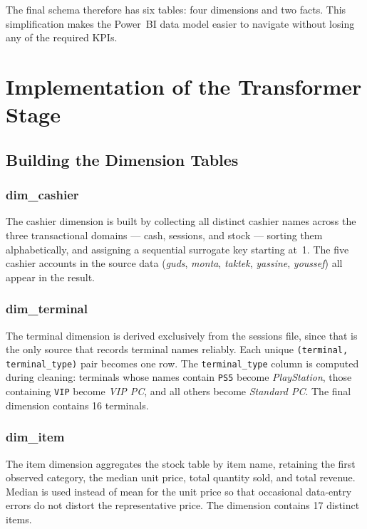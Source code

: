The final schema therefore has six tables: four dimensions and two facts. This
simplification makes the Power~BI data model easier to navigate without losing any
of the required KPIs.

\section{Implementation of the Transformer Stage}

\subsection{Building the Dimension Tables}

\subsubsection{dim\_cashier}

The cashier dimension is built by collecting all distinct cashier names across the
three transactional domains — cash, sessions, and stock — sorting them alphabetically,
and assigning a sequential surrogate key starting at~1. The five cashier accounts
in the source data (\textit{guds}, \textit{monta}, \textit{taktek},
\textit{yassine}, \textit{youssef}) all appear in the result.

\subsubsection{dim\_terminal}

The terminal dimension is derived exclusively from the sessions file, since that is
the only source that records terminal names reliably. Each unique \texttt{(terminal,
terminal\_type)} pair becomes one row. The \texttt{terminal\_type} column is computed
during cleaning: terminals whose names contain \texttt{PS5} become \textit{PlayStation},
those containing \texttt{VIP} become \textit{VIP PC}, and all others become
\textit{Standard PC}. The final dimension contains 16 terminals.

\subsubsection{dim\_item}

The item dimension aggregates the stock table by item name, retaining the first
observed category, the median unit price, total quantity sold, and total revenue.
Median is used instead of mean for the unit price so that occasional data-entry errors
do not distort the representative price. The dimension contains 17 distinct items.

